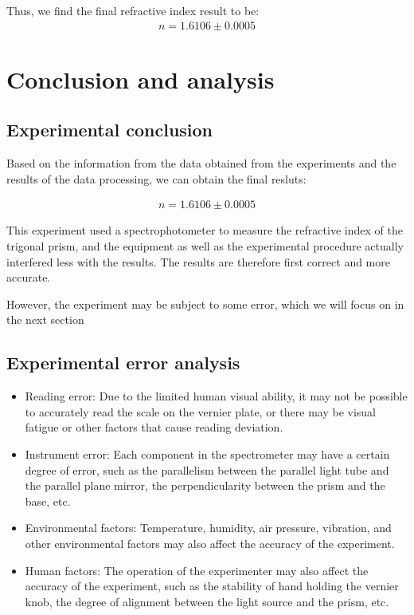 \documentclass[UTF8]{article}
\begin{document}
  Thus, we find the final refractive index result to be:
  \begin{eqnarray}
  n = 1.6106\pm 0.0005
  \end{eqnarray}
   
   
   
  
\section{Conclusion and analysis}
\subsection{Experimental conclusion}

Based on the information from the data obtained from the experiments and the results of the data processing, we can obtain the final resluts:

\begin{align*}
  n = 1.6106\pm 0.0005
\end{align*}

This experiment used a spectrophotometer to measure the refractive index of the trigonal prism, and the equipment as well as the experimental procedure actually interfered less with the results. The results are therefore first correct and more accurate.

However, the experiment may be subject to some error, which we will focus on in the next section

\subsection{Experimental error analysis}
\begin{itemize}
\item Reading error: Due to the limited human visual ability, it may not be possible to accurately read the scale on the vernier plate, or there may be visual fatigue or other factors that cause reading deviation.
\item Instrument error: Each component in the spectrometer may have a certain degree of error, such as the parallelism between the parallel light tube and the parallel plane mirror, the perpendicularity between the prism and the base, etc.
\item Environmental factors: Temperature, humidity, air pressure, vibration, and other environmental factors may also affect the accuracy of the experiment.
\item Human factors: The operation of the experimenter may also affect the accuracy of the experiment, such as the stability of hand holding the vernier knob, the degree of alignment between the light source and the prism, etc.
\end{itemize}
\end{document}
